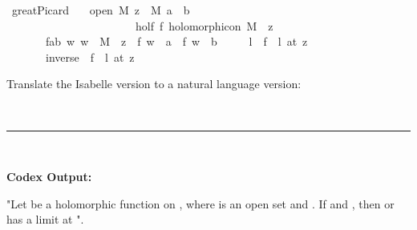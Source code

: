 \documentclass{article}
\begin{document}
\begin{boxB}
\begin{isabelle}
\isamarkupfalse \ great{\isacharunderscore}{\kern0pt}Picard{\isacharcolon}{\kern0pt}\isanewline
\ \ \ {\isachardoublequoteopen}open\ M{\isachardoublequoteclose}\ {\isachardoublequoteopen}z\ {\isasymin}\ M{\isachardoublequoteclose}\ {\isachardoublequoteopen}a\ {\isasymnoteq}\ b{\isachardoublequoteclose}\ \isanewline
\ \ \ \ \ \ \ \ \ \ \ \ \ \ \ \ \ \ \ \ \ \ \ holf{\isacharcolon}{\kern0pt}\ {\isachardoublequoteopen}f\ holomorphic{\isacharunderscore}{\kern0pt}on\ {\isacharparenleft}{\kern0pt}M\ {\isacharminus}{\kern0pt}\ {\isacharbraceleft}{\kern0pt}z{\isacharbraceright}{\kern0pt}{\isacharparenright}{\kern0pt}{\isachardoublequoteclose}\isanewline
\ \ \ \ \ \ \ fab{\isacharcolon}{\kern0pt}\ {\isachardoublequoteopen}{\isasymAnd}w{\isachardot}{\kern0pt}\ w\ {\isasymin}\ M\ {\isacharminus}{\kern0pt}\ {\isacharbraceleft}{\kern0pt}z{\isacharbraceright}{\kern0pt}\ {\isasymLongrightarrow}\ f\ w\ {\isasymnoteq}\ a\ {\isasymand}\ f\ w\ {\isasymnoteq}\ b{\isachardoublequoteclose}\isanewline
\ \ \ \ \ l\ \ {\isachardoublequoteopen}{\isacharparenleft}{\kern0pt}f\ {\isasymlonglongrightarrow}\ l{\isacharparenright}{\kern0pt}\ {\isacharparenleft}{\kern0pt}at\ z{\isacharparenright}{\kern0pt}\ \isanewline
\ \ \ \ \ \ {\isasymor}\ {\isacharparenleft}{\kern0pt}{\isacharparenleft}{\kern0pt}inverse\ {\isasymcirc}\ f{\isacharparenright}{\kern0pt}\ {\isasymlonglongrightarrow}\ l{\isacharparenright}{\kern0pt}\ {\isacharparenleft}{\kern0pt}at\ z{\isacharparenright}{\kern0pt}{\isachardoublequoteclose}
\end{isabelle}
Translate the Isabelle version to a natural language version:

\
\hrule
\

\textbf{Codex Output:}

"Let  be a holomorphic function on , where  is an open set and . If  and , then  or  has a limit at ".
\end{boxB}
\end{document}
